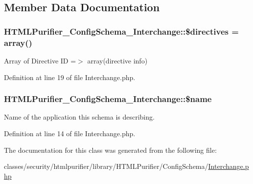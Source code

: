 \subsection{Member Data Documentation}
\hypertarget{classHTMLPurifier__ConfigSchema__Interchange_a3843ecbd13ae7227f509ce8336ce18ac}{
\subsubsection[{\$directives}]{\setlength{\rightskip}{0pt plus 5cm}H\+T\+M\+L\+Purifier\+\_\+\+Config\+Schema\+\_\+\+Interchange\+::\$directives = array()}}\label{classHTMLPurifier__ConfigSchema__Interchange_a3843ecbd13ae7227f509ce8336ce18ac}
Array of Directive I\+D =$>$ array(directive info) 

Definition at line 19 of file Interchange.\+php.

\hypertarget{classHTMLPurifier__ConfigSchema__Interchange_afc0f02aa85fcf661b554115466995f35}{
\subsubsection[{\$name}]{\setlength{\rightskip}{0pt plus 5cm}H\+T\+M\+L\+Purifier\+\_\+\+Config\+Schema\+\_\+\+Interchange\+::\$name}}\label{classHTMLPurifier__ConfigSchema__Interchange_afc0f02aa85fcf661b554115466995f35}
Name of the application this schema is describing. 

Definition at line 14 of file Interchange.\+php.



The documentation for this class was generated from the following file\+:\begin{DoxyCompactItemize}
\item 
classes/security/htmlpurifier/library/\+H\+T\+M\+L\+Purifier/\+Config\+Schema/\hyperlink{Interchange_8php}{Interchange.\+php}\end{DoxyCompactItemize}
